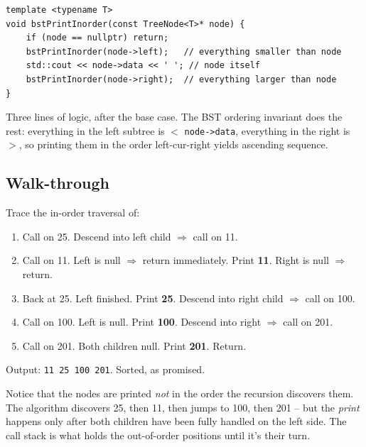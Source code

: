 \documentclass[11pt]{article}
\begin{document}
\begin{lstlisting}
template <typename T>
void bstPrintInorder(const TreeNode<T>* node) {
    if (node == nullptr) return;
    bstPrintInorder(node->left);   // everything smaller than node
    std::cout << node->data << ' '; // node itself
    bstPrintInorder(node->right);  // everything larger than node
}
\end{lstlisting}

Three lines of logic, after the base case. The BST ordering invariant does the rest: everything in the left subtree is $<$ \texttt{node->data}, everything in the right is $>$, so printing them in the order left-cur-right yields ascending sequence.

\subsection*{Walk-through}

Trace the in-order traversal of:

\begin{center}
\end{center}

\begin{enumerate}[leftmargin=*]
    \item Call on 25. Descend into left child $\Rightarrow$ call on 11.
    \item Call on 11. Left is null $\Rightarrow$ return immediately. Print \textbf{11}. Right is null $\Rightarrow$ return.
    \item Back at 25. Left finished. Print \textbf{25}. Descend into right child $\Rightarrow$ call on 100.
    \item Call on 100. Left is null. Print \textbf{100}. Descend into right $\Rightarrow$ call on 201.
    \item Call on 201. Both children null. Print \textbf{201}. Return.
\end{enumerate}

Output: \texttt{11 25 100 201}. Sorted, as promised.

\begin{ideabox}
Notice that the nodes are printed \emph{not} in the order the recursion discovers them. The algorithm discovers 25, then 11, then jumps to 100, then 201 -- but the \emph{print} happens only after both children have been fully handled on the left side. The call stack is what holds the out-of-order positions until it's their turn.
\end{ideabox}
\end{document}
